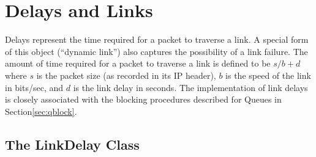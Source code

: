 \chapter{Delays and Links}
\label{chap:delays}

Delays represent the time required for a packet to
traverse a link.
A special form of this object (``dynamic link'')
also captures the possibility of a link failure.
The amount of time required for a packet to traverse a link
is defined to be $s/b + d$ where $s$ is the packet size
(as recorded in its IP header), $b$ is the speed of the link
in bits/sec, and $d$ is the link delay in seconds.
The implementation of link delays is closely associated with
the blocking procedures described for Queues in
Section\ref{sec:qblock}.

\section{The LinkDelay Class}
\label{sec:delayclass}

